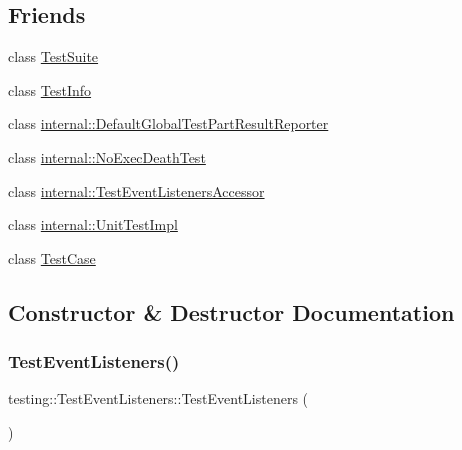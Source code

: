 \subsection*{Friends}
\begin{DoxyCompactItemize}
\item 
class \mbox{\hyperlink{classtesting_1_1_test_event_listeners_afa75eb3bdc22807c1d4fcf818c6f0fbf}{Test\+Suite}}
\item 
class \mbox{\hyperlink{classtesting_1_1_test_event_listeners_aed3c96e2bd5a46339c1cbe49a4a233ee}{Test\+Info}}
\item 
class \mbox{\hyperlink{classtesting_1_1_test_event_listeners_ac731f0389a3fc3cae64a80a5e53acc2a}{internal\+::\+Default\+Global\+Test\+Part\+Result\+Reporter}}
\item 
class \mbox{\hyperlink{classtesting_1_1_test_event_listeners_a6a1fde70fe3144b5b2b8f68a131a171f}{internal\+::\+No\+Exec\+Death\+Test}}
\item 
class \mbox{\hyperlink{classtesting_1_1_test_event_listeners_aab870c143f007b57c30389c7d5a84ea3}{internal\+::\+Test\+Event\+Listeners\+Accessor}}
\item 
class \mbox{\hyperlink{classtesting_1_1_test_event_listeners_aa684cc13a8f91b00c0c9ce41ec7474eb}{internal\+::\+Unit\+Test\+Impl}}
\item 
class \mbox{\hyperlink{classtesting_1_1_test_event_listeners_aff779e55b06adfa7c0088bd10253f0f0}{Test\+Case}}
\end{DoxyCompactItemize}


\subsection{Constructor \& Destructor Documentation}
\mbox{\label{classtesting_1_1_test_event_listeners_af0716e4067a6f357ee5ea18802a591dd}} 
\subsubsection{\texorpdfstring{TestEventListeners()}{TestEventListeners()}\hspace{0.1cm}{\footnotesize\ttfamily [1/3]}}
{\footnotesize\ttfamily testing\+::\+Test\+Event\+Listeners\+::\+Test\+Event\+Listeners (\begin{DoxyParamCaption}{ }\end{DoxyParamCaption})}

